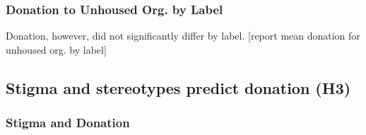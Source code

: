 \documentclass[
  man,
  floatsintext,
  longtable,
  nolmodern,
  notxfonts,
  notimes,
  colorlinks=true,linkcolor=blue,citecolor=blue,urlcolor=blue]{apa7}
\begin{document}
\subsubsection{Donation to Unhoused Org. by
Label}\label{donation-to-unhoused-org.-by-label}

Donation, however, did not significantly differ by label. {[}report mean
donation for unhoused org. by label{]}

\begin{figure}

\caption{\label{fig-donate-all-by-label}}


\end{figure}%

\subsection{Stigma and stereotypes predict donation
(H3)}\label{stigma-and-stereotypes-predict-donation-h3}

\subsubsection{Stigma and Donation}\label{stigma-and-donation}
\end{document}
